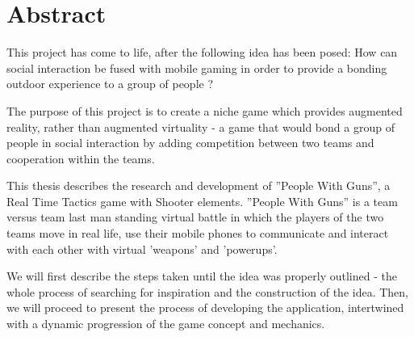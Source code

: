 \section{Abstract}

This project has come to life, after the following idea has been posed: How can
social interaction be fused with mobile gaming in order to provide a bonding
outdoor experience to a group of people ? 

The purpose of this project is to create a niche game which provides augmented
reality, rather than augmented virtuality - a game that would bond a group of
people in social interaction by adding competition between two teams and
cooperation within the teams.\newline

This thesis describes the research and development of ''People With Guns'', a
Real Time Tactics game with Shooter elements. ''People With Guns'' is a team
versus team last man standing virtual battle in which the players of the two
teams move in real life, use their mobile phones to communicate and interact
with each other with virtual 'weapons' and 'powerups'.\newline

We will first describe the steps taken until the idea was properly outlined -
the whole process of searching for inspiration and the construction of the idea.
Then, we will proceed to present the process of developing the application,
intertwined with a dynamic progression of the game concept and
mechanics.\newline
